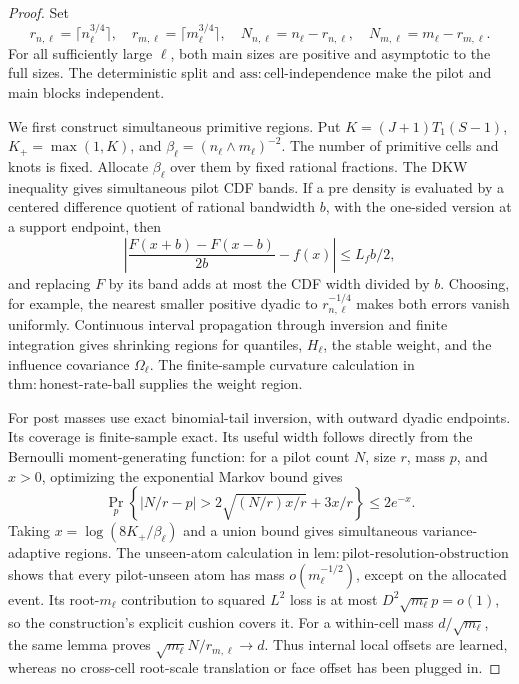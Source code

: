 \documentclass{article}
\begin{document}
\begin{proof}
Set
\[
 r_{n,\ell}=\lceil n_\ell^{3/4}\rceil,
 \quad r_{m,\ell}=\lceil m_\ell^{3/4}\rceil,
 \quad N_{n,\ell}=n_\ell-r_{n,\ell},
 \quad N_{m,\ell}=m_\ell-r_{m,\ell}.
\]
For all sufficiently large \(\ell\), both main sizes are positive and asymptotic to the full sizes.  The deterministic split and
\(\mathrm{ass:cell\mbox{-}independence}\) make the pilot and main blocks independent.

We first construct simultaneous primitive regions.  Put
\(K=(J+1)T_1(S-1)\), \(K_+=\max(1,K)\), and
\(\beta_\ell=(n_\ell\wedge m_\ell)^{-2}\).  The number of primitive cells and knots is fixed.  Allocate \(\beta_\ell\) over them by fixed rational fractions.  The DKW inequality gives simultaneous pilot CDF bands.  If a pre density is evaluated by a centered difference quotient of rational bandwidth \(b\), with the one-sided version at a support endpoint, then
\[
 \left|\frac{F(x+b)-F(x-b)}{2b}-f(x)\right|
 \leq L_fb/2,
\]
and replacing \(F\) by its band adds at most the CDF width divided by \(b\).  Choosing, for example, the nearest smaller positive dyadic to
\(r_{n,\ell}^{-1/4}\) makes both errors vanish uniformly.  Continuous interval propagation through inversion and finite integration gives shrinking regions for quantiles, \(H_\ell\), the stable weight, and the influence covariance \(\Omega_\ell\).  The finite-sample curvature calculation in
\(\mathrm{thm:honest\mbox{-}rate\mbox{-}ball}\) supplies the weight region.

For post masses use exact binomial-tail inversion, with outward dyadic endpoints.  Its coverage is finite-sample exact.  Its useful width follows directly from the Bernoulli moment-generating function: for a pilot count \(N\), size \(r\), mass \(p\), and \(x>0\), optimizing the exponential Markov bound gives
\[
 \Pr_p\left\{|N/r-p|>
 2\sqrt{(N/r)x/r}+3x/r\right\}\leq2e^{-x}.
\]
Taking \(x=\log(8K_+/\beta_\ell)\) and a union bound gives simultaneous variance-adaptive regions.  The unseen-atom calculation in
\(\mathrm{lem:pilot\mbox{-}resolution\mbox{-}obstruction}\) shows that every pilot-unseen atom has mass \(o(m_\ell^{-1/2})\), except on the allocated event.  Its root-\(m_\ell\) contribution to squared \(L^2\) loss is at most \(D^2\sqrt{m_\ell}p=o(1)\), so the construction's explicit cushion covers it.  For a within-cell mass \(d/\sqrt{m_\ell}\), the same lemma proves
\(\sqrt{m_\ell}N/r_{m,\ell}\to d\).  Thus internal local offsets are learned, whereas no cross-cell root-scale translation or face offset has been plugged in.


\end{proof}
\end{document}

